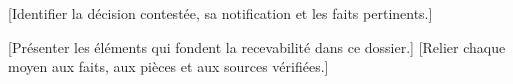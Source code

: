 

\EnteteDocument
{}
[Identifier la décision contestée, sa notification et les faits pertinents.]

[Présenter les éléments qui fondent la recevabilité dans ce dossier.]
[Relier chaque moyen aux faits, aux pièces et aux sources vérifiées.]

\SignatureRequerant

\clearpage
\BordereauPieces

